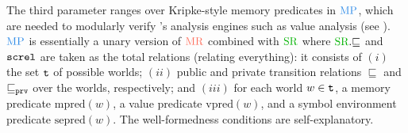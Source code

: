 







The third parameter ranges over Kripke-style memory predicates in $\MPRED$,
which are needed to modularly verify \cc{}'s analysis engines such as value analysis (see ).
$\MPRED$ is essentially a unary version of $\MREL$ combined with $\SREL$
where $\SREL{}.{\sqsubseteq}$ and $\texttt{screl}$ are taken as the total relations (\ie relating everything):
it consists of
$(i)$ the set $\texttt{t}$ of possible worlds;
$(ii)$ public and private transition relations $\sqsubseteq$ and $\sqsubseteq_{\texttt{prv}}$ over the worlds, respectively; and
$(iii)$ for each world $w \in \texttt{t}$, a memory predicate $\textrm{mpred}(w)$,
a value predicate $\textrm{vpred}(w)$, and a symbol environment predicate $\textrm{sepred}(w)$.
The well-formedness conditions are self-explanatory.

